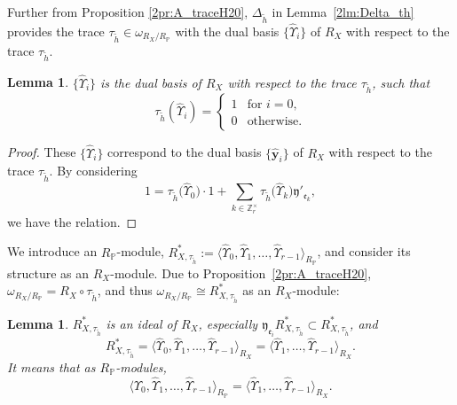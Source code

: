 \documentclass[pdftex]{sigma}
\def\ZZ{{\mathbb Z}}
\def\PP{{\mathbb P}}
\def\fe{{\mathfrak e}}
\def\fy{{\mathfrak y}}
\def\th{{\widetilde h}}
\def\hby{\widehat {{\mathbf y}}}
\def\hUpsilon{{\widehat \Upsilon}}
\numberwithin{equation}{section}
\newtheorem{Lemma}[Theorem]{Lemma}
\begin{document}
Further from Proposition \ref{2pr:A_traceH20}, $\Delta_{\th}$ in Lemma~\ref{2lm:Delta_th} provides the trace $\tau_\th\in \omega_{R_X/R_\PP}$ with the dual basis $\big\{\hUpsilon_{i}\big\}$ of $R_X$ with respect to the trace $\tau_\th$.

\begin{Lemma}\label{2lm:tau_th_hUpsiolon}
$\big\{\hUpsilon_{i}\big\}$ is the dual basis of $R_X$ with respect to the trace $\tau_\th$, such that
\[
\tau_\th(\hUpsilon_{i}) =
\begin{cases}
1 & \text{for } i=0,\\
0 & \text{otherwise}.
\end{cases}
\]
\end{Lemma}

\begin{proof}These $\big\{\hUpsilon_{i}\big\}$ correspond to the dual basis $\{\hby_i\}$ of $R_X$ with respect to the trace $\tau_\th$. By considering
\[
1= \tau_\th\big(\hUpsilon_{0}\big) \cdot 1
+\sum_{k\in \ZZ_r^\times}
 \tau_\th\big(\hUpsilon_{k}\big) \fy'_{\fe_k},
\]
we have the relation.
\end{proof}

We introduce an $R_\PP$-module,
$R_{X,\tau_\th}^*:=\big\langle\hUpsilon_{0}, \hUpsilon_{1}, \dots, \hUpsilon_{r-1} \big\rangle_{R_\PP}$,
and consider its structure as an $R_X$-module.
Due to Proposition~\ref{2pr:A_traceH20}, $\omega_{R_X/R_\PP}=R_X\circ \tau_\th$, and thus $\omega_{R_X/R_\PP}\cong R_{X,\tau_\th}^*$ as an $R_X$-module:

\begin{Lemma}\label{2lm:ideal_hUpsilon}
$R_{X,\tau_\th}^*$ is an ideal of $R_X$, especially
 $\fy_{\fe_i} R_{X,\tau_\th}^* \subset R_{X,\tau_\th}^*$, and
\[
R_{X,\tau_\th}^*=
\big\langle \hUpsilon_{0}, \hUpsilon_{1}, \dots, \hUpsilon_{r-1}\big\rangle_{R_X}=
\big\langle \hUpsilon_{1}, \dots, \hUpsilon_{r-1}\big\rangle_{R_X}.
\]
It means that as $R_\PP$-modules,
\[
\big\langle \hUpsilon_{0}, \hUpsilon_{1}, \dots, \hUpsilon_{r-1}\big\rangle_{R_\PP}=
\big\langle \hUpsilon_{1}, \dots, \hUpsilon_{r-1}\big\rangle_{R_X}.
\]
\end{Lemma}
\end{document}
